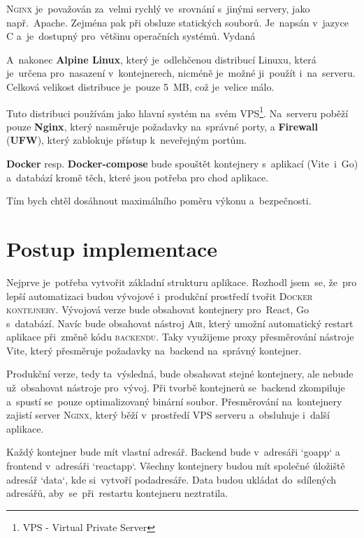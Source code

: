 \documentclass[14pt,a4paper]{article}
\begin{document}
            \textsc{Nginx} je~považován za~velmi rychlý ve~srovnání s~jinými servery, jako např.~Apache. Zejména pak při obsluze statických souborů.
            Je~napsán v~jazyce C a~je~dostupný pro~většinu operačních systémů. Vydaná  \parencite{WhatNGINX}

            A~nakonec \textbf{Alpine Linux}, který je~odlehčenou distribucí Linuxu, která je~určena pro~nasazení v~kontejnerech,
            nicméně je~možné ji~použít i~na~serveru. Celková velikost distribuce je~pouze 5~MB, což je~velice málo.

            Tuto distribuci používám jako hlavní systém na~svém VPS\footnote{VPS - Virtual Private Server}.
            Na~serveru poběží pouze \textbf{Nginx}, který nasměruje požadavky na~správné porty, a \textbf{Firewall} (\textbf{UFW}), který zablokuje přístup k~neveřejným portům.

            \textbf{Docker} resp. \textbf{Docker-compose} bude spouštět kontejnery s~aplikací (Vite~i~Go) a~databází
            kromě těch, které jsou potřeba pro chod aplikace.

            Tím bych chtěl dosáhnout maximálního poměru výkonu a~bezpečnosti.
	
	\section{Postup implementace}
        Nejprve je~potřeba vytvořit základní strukturu aplikace. Rozhodl jsem~se, že~pro lepší automatizaci budou vývojové i~produkční prostředí tvořit \textsc{Docker kontejnery}.
        Vývojová verze bude obsahovat kontejnery pro~React, Go s~databází. Navíc bude obsahovat nástroj \textsc{Air}, který umožní automatický restart aplikace při~změně kódu \textsc{backendu}. Taky využijeme proxy přesměrování nástroje Vite, který přesměruje požadavky na~backend na~správný kontejner.

        Produkční verze, tedy ta~výsledná, bude obsahovat stejné kontejnery, ale nebude už~obsahovat nástroje pro~vývoj. Při tvorbě kontejnerů se~backend zkompiluje a~spustí se~pouze optimalizovaný binární soubor.
        Přesměrování na~kontejnery zajistí server \textsc{Nginx}, který běží v~prostředí VPS serveru a~obsluhuje i~další aplikace.

        Každý kontejner bude mít vlastní adresář. Backend bude v~adresáři `goapp` a frontend v~adresáři `reactapp`. Všechny kontejnery budou mít společné úložiště adresář `data`, kde si~vytvoří podadresáře. Data budou ukládat do~sdílených adresářů, aby~se~při~restartu kontejneru neztratila.
\end{document}
